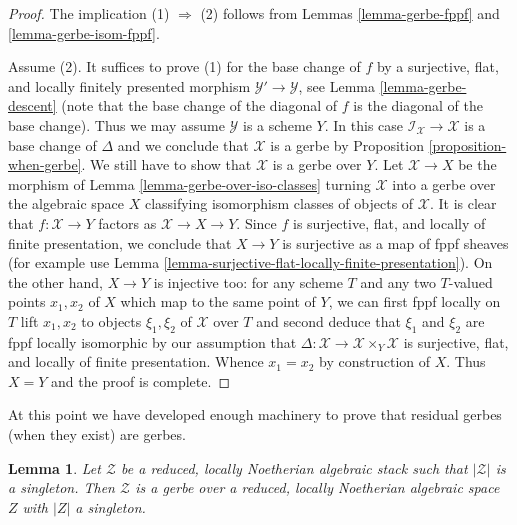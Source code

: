 \documentclass{stacks-project}
\theoremstyle{plain}
\newtheorem{lemma}[subsection]{Lemma}
\theoremstyle{definition}
\theoremstyle{remark}
\numberwithin{equation}{subsection}
\begin{document}
\begin{proof}
The implication (1) $\Rightarrow$ (2) follows from
Lemmas \ref{lemma-gerbe-fppf} and \ref{lemma-gerbe-isom-fppf}.

\medskip\noindent
Assume (2). It suffices to prove (1) for the base change of $f$
by a surjective, flat, and locally finitely presented morphism
$\mathcal{Y}' \to \mathcal{Y}$, see
Lemma \ref{lemma-gerbe-descent} (note that the base change
of the diagonal of $f$ is the diagonal of the base change). 
Thus we may assume $\mathcal{Y}$ is a scheme $Y$.
In this case $\mathcal{I}_\mathcal{X} \to \mathcal{X}$
is a base change of $\Delta$ and
we conclude that $\mathcal{X}$ is a gerbe
by Proposition \ref{proposition-when-gerbe}.
We still have to show that $\mathcal{X}$ is a gerbe over $Y$.
Let $\mathcal{X} \to X$ be the morphism of
Lemma \ref{lemma-gerbe-over-iso-classes}
turning $\mathcal{X}$ into a gerbe over the algebraic space $X$
classifying isomorphism classes of objects of $\mathcal{X}$.
It is clear that $f : \mathcal{X} \to Y$ factors as
$\mathcal{X} \to X \to Y$. Since $f$ is surjective, flat, and
locally of finite presentation, we conclude that $X \to Y$ is
surjective as a map of fppf sheaves (for example use
Lemma \ref{lemma-surjective-flat-locally-finite-presentation}).
On the other hand, $X \to Y$ is injective too: for any scheme
$T$ and any two $T$-valued points $x_1, x_2$ of $X$ which map to
the same point of $Y$, we can first fppf locally on $T$
lift $x_1, x_2$ to objects $\xi_1, \xi_2$ of $\mathcal{X}$ over $T$
and second deduce that $\xi_1$ and $\xi_2$ are fppf locally isomorphic
by our assumption that
$\Delta : \mathcal{X} \to \mathcal{X} \times_Y \mathcal{X}$
is surjective, flat, and locally of finite presentation.
Whence $x_1 = x_2$ by construction of $X$.
Thus $X = Y$ and the proof is complete.
\end{proof}

\noindent
At this point we have developed enough machinery to prove that residual
gerbes (when they exist) are gerbes.

\begin{lemma}
\label{lemma-noetherian-singleton-stack-gerbe}
Let $\mathcal{Z}$ be a reduced, locally Noetherian algebraic stack
such that $|\mathcal{Z}|$ is a singleton. Then $\mathcal{Z}$ is a gerbe
over a reduced, locally Noetherian algebraic space $Z$ with $|Z|$ a
singleton.
\end{lemma}
\end{document}
